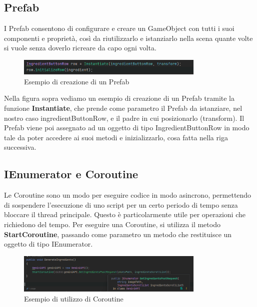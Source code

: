 \subsection{Prefab}
\label{sec:prefab}
I Prefab consentono di configurare e creare un GameObject con tutti i suoi componenti e proprietà, così da riutilizzarlo e istanziarlo nella scena quante volte si vuole senza doverlo ricreare da capo ogni volta.
\begin{figure}[H]
    \centering
    \includegraphics[width=0.8\textwidth,height=\textheight,keepaspectratio]{figures/chapter_1/prefabInstantiate.png}
    \caption{Esempio di creazione di un Prefab}
\end{figure}

Nella figura sopra vediamo un esempio di creazione di un Prefab tramite la funzione \textbf{Instantiate}, che prende come parametro il Prefab da istanziare, nel nostro caso ingredientButtonRow, e il padre in cui posizionarlo (transform). Il Prefab viene poi assegnato ad un oggetto di tipo IngredientButtonRow in modo tale da poter accedere ai suoi metodi e inizializzarlo, cosa fatta nella riga successiva. \cite{UnityPrefabs}


\subsection{IEnumerator e Coroutine}
Le Coroutine sono un modo per eseguire codice in modo asincrono, permettendo di sospendere l'esecuzione di uno script per un certo periodo di tempo senza bloccare il thread principale. Questo è particolarmente utile per operazioni che richiedono del tempo. Per eseguire una Coroutine, si utilizza il metodo \textbf{StartCoroutine}, passando come parametro un metodo che restituisce un oggetto di tipo IEnumerator.
\begin{figure}[H]
    \centering
    \includegraphics[width=0.8\textwidth,height=\textheight,keepaspectratio]{figures/chapter_1/UnityIEnumeratorCoroutine.png}
    \caption{Esempio di utilizzo di Coroutine}
\end{figure}

